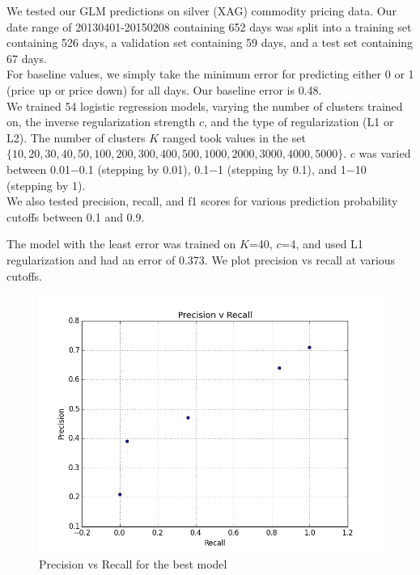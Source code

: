 We tested our GLM predictions on silver (XAG) commodity pricing data. Our date range of 20130401-20150208 containing 652 days was split into a training set containing 526 days, a validation set containing 59 days, and a test set containing 67 days.\\

For baseline values, we simply take the minimum error for predicting either 0 or 1 (price up or price down) for all days. Our baseline error is 0.48.\\

We trained 54 logistic regression models, varying the number of clusters trained on, the inverse regularization strength $c$, and the type of regularization (L1 or L2). The number of clusters $K$ ranged took values in the set $\{10,20,30,40,50,100,200,300,400,500,1000,2000,3000,4000,5000\}$. $c$ was varied between 0.01−0.1 (stepping by 0.01), 0.1−1 (stepping by 0.1), and 1−10 (stepping by 1).\\

We also tested precision, recall, and f1 scores for various prediction probability cutoffs between 0.1 and 0.9.

The model with the least error was trained on $K$=40, $c$=4, and used L1 regularization and had an error of 0.373. We plot precision vs recall at various cutoffs. 

\begin{figure}[ht]
\vskip 0.2in
\begin{center}
\centerline{\includegraphics[scale=0.15]{images/precision_v_recall.png}}
\caption{Precision vs Recall for the best model}
\end{center}
\vskip -0.2in
\label{fig:precision_v_recall}
\end{figure} 

